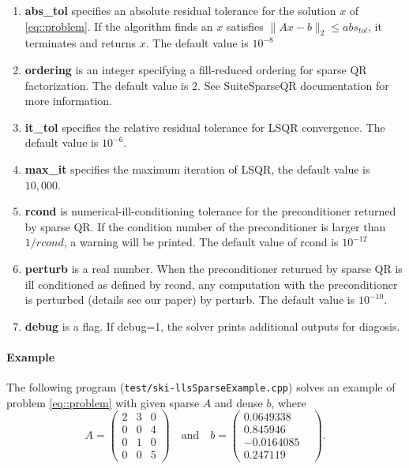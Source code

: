 \documentclass[english,11pt]{article}
\begin{document}
\begin{itemize}
\begin{enumerate}
			\item {\bf abs_tol} specifies an absolute residual tolerance for the solution $x$ of \ref{eq::problem}. If the algorithm finds an $x$ satisfies $\|Ax-b\|_2 \leq abs_{tol}$, it terminates and returns $x$. The default value is $10^{-8}$

			\item {\bf ordering} is an integer specifying a fill-reduced ordering for sparse QR factorization. The default value is 2. See SuiteSparseQR documentation for more information. 

			\item {\bf it_tol} specifies the relative residual tolerance for LSQR convergence. The default value is $10^{-6}$.
			

			\item {\bf max_it} specifies the maximum iteration of LSQR, the default value is $10,000$. 

			\item {\bf rcond} is numerical-ill-conditioning tolerance for the preconditioner returned by sparse QR. If the condition number of the preconditioner is larger than $1/rcond$, a warning will be printed. The default value of rcond is $10^{-12}$

			\item {\bf perturb} is a real number. When the preconditioner returned by sparse QR is ill conditioned as defined by rcond, any computation with the preconditioner is perturbed (details see our paper) by perturb. The default value is $10^{-10}$. 

			\item {\bf debug} is a flag. If debug=1, the solver prints additional outputs for diagosis. 
		\end{enumerate}
		

	\end{itemize}

\paragraph{Example}

The following program ({\tt test/ski-llsSparseExample.cpp}) solves an example of problem \eqref{eq::problem} with given sparse $A$ and dense $b$, where 
\begin{equation}
A = \begin{pmatrix}
     2     & 3     & 0\\
     0     & 0     & 4\\
     0     & 1     & 0\\
     0     & 0     & 5
\end{pmatrix} \quad \text{and} \quad 
b = \begin{pmatrix}
0.0649338 \\
0.845946 \\
-0.0164085\\
0.247119 & 
\end{pmatrix}.
\end{equation}
\end{document}
